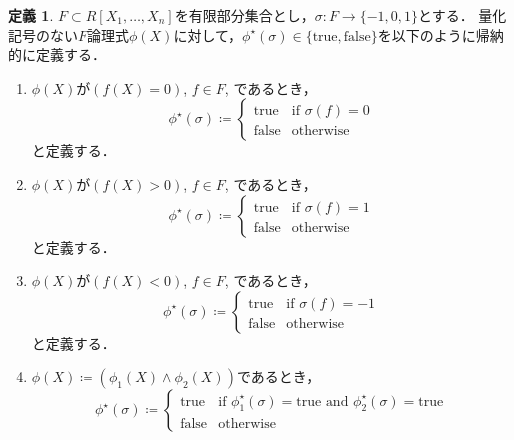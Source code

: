 \documentclass[uplatex, dvipdfmx]{jsarticle}
\numberwithin{equation}{section}
\newcommand{\map}[3]{{#1}\colon{#2}\rightarrow{#3}}
\newcommand{\true}{\text{true}}
\newcommand{\false}{\text{false}}
\theoremstyle{definition}
\newtheorem{definition}{定義}[section]
\begin{document}
\begin{definition}
     $F \subset R[X_1, \dots, X_n]$を有限部分集合とし，$\map{\sigma}{F}{\{-1, 0, 1\}}$とする．
     量化記号のない$F$論理式$\phi(X)$に対して，$\phi^\star(\sigma) \in \{\true, \false\}$を以下のように帰納的に定義する．
     \begin{enumerate}
          \item $\phi(X)$が$(f(X)=0)$, $f \in F$, であるとき，
          \begin{equation}
               \phi^\star(\sigma)\coloneqq \begin{cases}
                    \true  & \text{if $\sigma(f)=0$}\\
                    \false & \text{otherwise}
               \end{cases}
          \end{equation}
          と定義する．
          \item $\phi(X)$が$(f(X)>0)$, $f \in F$, であるとき，
          \begin{equation}
               \phi^\star(\sigma)\coloneqq \begin{cases}
                    \true  & \text{if $\sigma(f)=1$}\\
                    \false & \text{otherwise}
               \end{cases}
          \end{equation}
          と定義する．
          \item $\phi(X)$が$(f(X)<0)$, $f \in F$, であるとき，
          \begin{equation}
               \phi^\star(\sigma)\coloneqq \begin{cases}
                    \true  & \text{if $\sigma(f)=-1$}\\
                    \false & \text{otherwise}
               \end{cases}
          \end{equation}
          と定義する．
          \item $\phi(X)\coloneqq (\phi_1(X) \land \phi_2(X))$であるとき，
          \begin{equation}
               \phi^\star(\sigma)\coloneqq \begin{cases}
                    \true  & \text{if $\phi_1^\star(\sigma)=\true$ and $\phi_2^\star(\sigma)=\true$}\\
                    \false & \text{otherwise}
               \end{cases}
          \end{equation}

\end{enumerate}
\end{definition}
\end{document}
